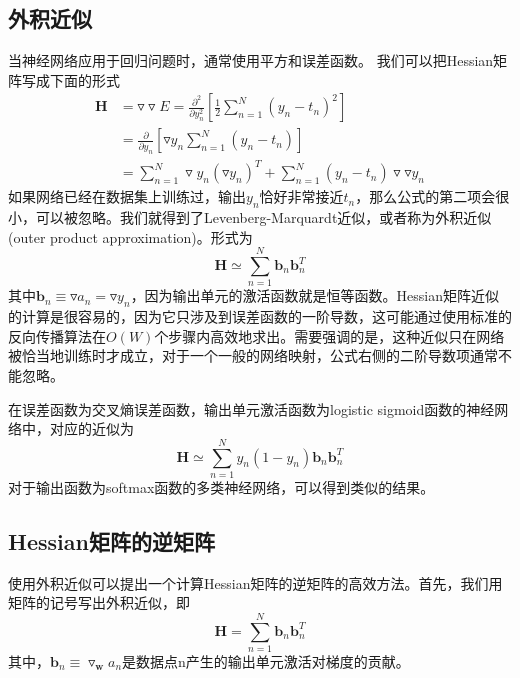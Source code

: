 \subsection*{外积近似}
当神经网络应用于回归问题时，通常使用平方和误差函数。
我们可以把Hessian矩阵写成下面的形式
\begin{equation}
	\begin{aligned}
		\boldsymbol{H}&=\triangledown\triangledown E=\frac{\partial^2}{\partial y_n^2}\left[\frac{1}{2}\sum_{n=1}^{N}(y_n-t_n)^2 \right]\\
		&=\frac{\partial}{\partial y_n}\left[\triangledown y_n\sum_{n=1}^{N}(y_n-t_n) \right]\\
		&=\sum_{n=1}^{N}\triangledown y_n(\triangledown y_n)^T+\sum_{n=1}^{N}(y_n-t_n)\triangledown\triangledown y_n
	\end{aligned}
\end{equation}
如果网络已经在数据集上训练过，输出$y_n$恰好非常接近$t_n$，那么公式的第二项会很小，可以被忽略。我们就得到了Levenberg-Marquardt近似，或者称为外积近似(outer product approximation)。形式为
\begin{equation}
	\boldsymbol{H}\simeq \sum_{n=1}^{N}\boldsymbol{b}_n\boldsymbol{b}_n^T
\end{equation}
其中$\boldsymbol{b}_n\equiv \triangledown a_n=\triangledown y_n$，因为输出单元的激活函数就是恒等函数。Hessian矩阵近似的计算是很容易的，因为它只涉及到误差函数的一阶导数，这可能通过使用标准的反向传播算法在$O(W)$个步骤内高效地求出。需要强调的是，这种近似只在网络被恰当地训练时才成立，对于一个一般的网络映射，公式右侧的二阶导数项通常不能忽略。

在误差函数为交叉熵误差函数，输出单元激活函数为logistic sigmoid函数的神经网络中，对应的近似为
\begin{equation}
	\boldsymbol{H}\simeq \sum_{n=1}^{N}y_n(1-y_n)\boldsymbol{b}_n\boldsymbol{b}_n^T
\end{equation}
对于输出函数为softmax函数的多类神经网络，可以得到类似的结果。
\subsection*{Hessian矩阵的逆矩阵}
使用外积近似可以提出一个计算Hessian矩阵的逆矩阵的高效方法。首先，我们用矩阵的记号写出外积近似，即
\begin{equation}
\boldsymbol{H}= \sum_{n=1}^{N}\boldsymbol{b}_n\boldsymbol{b}_n^T
\end{equation}
其中，$\boldsymbol{b}_n\equiv \triangledown_{\boldsymbol{w}}a_n$是数据点n产生的输出单元激活对梯度的贡献。

